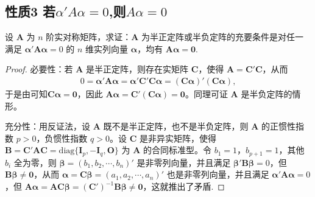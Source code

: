 \documentclass[../../main.tex]{subfiles}%
\begin{document}
\subsection{性质3 若$\alpha'A\alpha=0$,则$A\alpha=0$}

\begin{proposition}\label{proposition:半正/负定阵关于线性方程的充要条件}
设 $\boldsymbol{A}$ 为 $n$ 阶实对称矩阵，求证：$\boldsymbol{A}$ 为半正定阵或半负定阵的充要条件是对任一满足 $\boldsymbol{\alpha}'\boldsymbol{A}\boldsymbol{\alpha}=0$ 的 $n$ 维实列向量 $\boldsymbol{\alpha}$，均有 $\boldsymbol{A}\boldsymbol{\alpha}=\boldsymbol{0}$.
\end{proposition}
\begin{proof}

{\heiti 必要性：}若 $\boldsymbol{A}$ 是半正定阵，则存在实矩阵 $\boldsymbol{C}$，使得 $\boldsymbol{A}=\boldsymbol{C}'\boldsymbol{C}$，从而
\begin{align*}
0 = \boldsymbol{\alpha}'\boldsymbol{A}\boldsymbol{\alpha}=\boldsymbol{\alpha}'\boldsymbol{C}'\boldsymbol{C}\boldsymbol{\alpha}=(\boldsymbol{C}\boldsymbol{\alpha})'(\boldsymbol{C}\boldsymbol{\alpha}),
\end{align*}
于是由可知$\boldsymbol{C}\boldsymbol{\alpha}=\boldsymbol{0}$，因此 $\boldsymbol{A}\boldsymbol{\alpha}=\boldsymbol{C}'(\boldsymbol{C}\boldsymbol{\alpha})=\boldsymbol{0}$。同理可证 $\boldsymbol{A}$ 是半负定阵的情形。

{\heiti 充分性：}用反证法，设 $\boldsymbol{A}$ 既不是半正定阵，也不是半负定阵，则 $\boldsymbol{A}$ 的正惯性指数 $p > 0$，负惯性指数 $q > 0$。设 $\boldsymbol{C}$ 是非异实矩阵，使得 $\boldsymbol{B}=\boldsymbol{C}'\boldsymbol{A}\boldsymbol{C}=\mathrm{diag}\{\boldsymbol{I}_p,-\boldsymbol{I}_q,\boldsymbol{O}\}$ 为 $\boldsymbol{A}$ 的合同标准型。令 $b_1 = 1$，$b_{p + 1}= 1$，其他 $b_i$ 全为零，则 $\boldsymbol{\beta}=(b_1,b_2,\cdots,b_n)'$ 是非零列向量，并且满足 $\boldsymbol{\beta}'\boldsymbol{B}\boldsymbol{\beta}=0$，但 $\boldsymbol{B}\boldsymbol{\beta}\neq\boldsymbol{0}$，从而 $\boldsymbol{\alpha}=\boldsymbol{C}\boldsymbol{\beta}=(a_1,a_2,\cdots,a_n)'$ 也是非零列向量，并且满足 $\boldsymbol{\alpha}'\boldsymbol{A}\boldsymbol{\alpha}=0$，但 $\boldsymbol{A}\boldsymbol{\alpha}=\boldsymbol{A}\boldsymbol{C}\boldsymbol{\beta}=(\boldsymbol{C}')^{-1}\boldsymbol{B}\boldsymbol{\beta}\neq\boldsymbol{0}$，这就推出了矛盾.
\end{proof}
\end{document}
